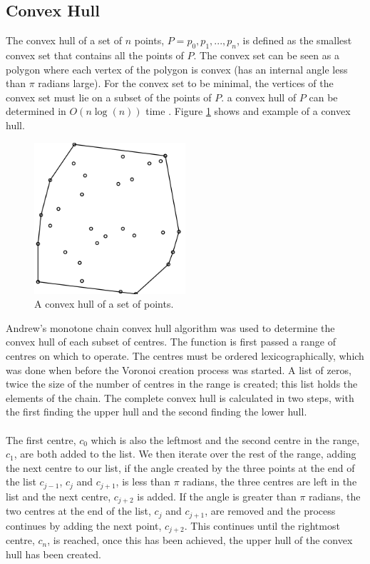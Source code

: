 \subsection{Convex Hull}
The convex hull of a set of $n$ points, $P = {p_0,p_1,...,p_n}$, is defined as the smallest convex set that contains all the points of $P$. The convex set can be seen as a polygon where each vertex of the polygon is convex (has an internal angle less than $\pi$ radians large). For the convex set to be minimal, the vertices of the convex set must lie on a subset of the points of $P$. a convex hull of $P$ can be determined in $O(n\log(n))$ time \citep{eddy1977new}. Figure \ref{fig:convexhull} shows and example of a convex hull.
\begin{figure}[H]
\centering
\includegraphics[width=0.5\textwidth]{Images/convexhull.png}
\caption[]{A convex hull of a set of points\footnotemark.}
\label{fig:convexhull}
\end{figure}
Andrew's monotone chain convex hull algorithm \citep{andrew1979another} was used to determine the convex hull of each subset of centres. The function is first passed a range of centres on which to operate. The centres must be ordered lexicographically, which was done when before the Voronoi creation process was started. A list of zeros, twice the size of the number of centres in the range is created; this list holds the elements of the chain. The complete convex hull is calculated in two steps, with the first finding the upper hull and the second finding the lower hull.
\\
\\
The first centre, $c_0$ which is also the leftmost and the second centre in the range, $c_1$, are both added to the list. We then iterate over the rest of the range, adding the next centre to our list, if the angle created by the three points at the end of the list $c_{j-1}$, $c_j$ and $c_{j+1}$, is less than $\pi$ radians, the three centres are left in the list and the next centre, $c_{j+2}$ is added. If the angle is greater than $\pi$ radians, the two centres at the end of the list, $c_j$ and $c_{j+1}$, are removed and the process continues by adding the next point, $c_{j+2}$. This continues until the rightmost centre, $c_n$, is reached, once this has been achieved, the upper hull of the convex hull has been created.
